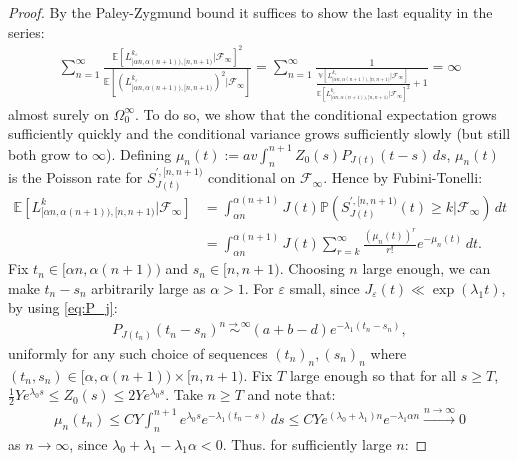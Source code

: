 \documentclass[10pt,a4paper]{amsart}
\begin{document}
\begin{proof}
  By the Paley-Zygmund bound it suffices to show the last equality in the series:
  \begin{align}
    \sum_{n=1}^\infty \frac{\mathbb{E}\left[L_{[\alpha n,\alpha (n+1)),[n,n+1)}^{k_\varepsilon}|\mathcal{F}_\infty\right]^2}{\mathbb{E}\left[\left(L_{[\alpha n,\alpha (n+1)),[n,n+1)}^{k_\varepsilon}\right)^2|\mathcal{F}_\infty\right]}=\sum_{n=1}^\infty \frac{1}{\frac{\mathbb{V}\left[L^{k_\varepsilon}_{[\alpha n,\alpha(n+1)),[n,n+1)}|\mathcal{F}_\infty\right]}{\mathbb{E}\left[L^{k_\varepsilon}_{[\alpha n,\alpha(n+1)),[n,n+1)}|\mathcal{F}_\infty\right]^2}+1}=\infty\label{eq:tight_limsup_to_show}
  \end{align}
  almost surely on $\Omega_0^\infty$. To do so, we show that the conditional expectation grows sufficiently quickly and the conditional variance grows sufficiently slowly (but still both grow to $\infty$). Defining $\mu_n(t):=av\int_n^{n+1}Z_0(s)P_{J(t)}(t-s)\,ds$, $\mu_n(t)$ is the Poisson rate for $S_{J(t)}^{',[n,n+1)}$ conditional on $\mathcal{F}_\infty$. Hence by Fubini-Tonelli:
  \begin{align}
    \mathbb{E}\left[L_{[\alpha n,\alpha (n+1)),[n,n+1)}^k|\mathcal{F}_\infty\right]&=\int_{\alpha n}^{\alpha(n+1)}J(t)\mathbb{P}\left(S_{J(t)}^{',[n,n+1)}(t)\geq k|\mathcal{F}_\infty\right)\,dt\nonumber\\
    &=\int_{\alpha n}^{\alpha(n+1)}J(t)\sum_{r=k}^\infty\frac{(\mu_n(t))^r}{r!}e^{-\mu_n(t)}\,dt.\label{eq:L_limsup_larger_1}
\end{align}
Fix $t_n\in [\alpha n,\alpha(n+1))$ and $s_n\in [n,n+1)$. Choosing $n$ large enough, we can make $t_n-s_n$ arbitrarily large as $\alpha>1$. For $\varepsilon$ small, since $J_\varepsilon(t)\ll \exp(\lambda_1 t)$, by using \ref{eq:P_j}:
\begin{align*}
    P_{J(t_n)}(t_n-s_n)\overset{n\to\infty}{\sim} (a+b-d)e^{-\lambda_1 (t_n-s_n)},
\end{align*}
uniformly for any such choice of sequences $(t_n)_n,(s_n)_n$ where $(t_n,s_n)\in [\alpha,\alpha(n+1))\times [n,n+1)$. Fix $T$ large enough so that for all $s\geq T$, $\frac{1}{2}Ye^{\lambda_0 s}\leq Z_0(s)\leq 2Ye^{\lambda_0 s}$. Take $n\geq T$ and note that:
\begin{align*}
    \mu_n(t_n)\leq CY\int_n^{n+1}e^{\lambda_0 s}e^{-\lambda_1(t_n-s)}\,ds\leq CYe^{(\lambda_0+\lambda_1) n}e^{-\lambda_1\alpha n}\overset{n\to\infty}{\to}0
\end{align*}
as $n\to\infty$, since $\lambda_0+\lambda_1-\lambda_1\alpha<0$. Thus. for sufficiently large $n$:

\end{proof}
\end{document}
